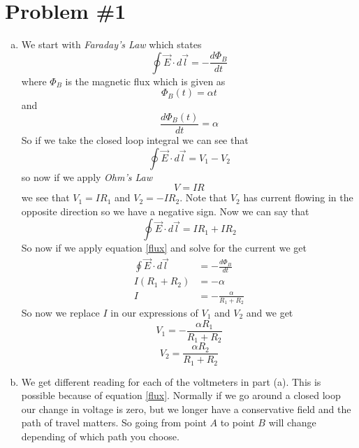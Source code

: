 \documentclass[11pt]{article}
\numberwithin{equation}{section}
\newcommand{\vecE}{\vec{E}}
\begin{document}


\section{Problem \#1}
\begin{enumerate}[(a)]
\item 
We start with \emph{Faraday's Law} which states
\begin{equation}
\oint\vec{E}\cdot d\vec{l} = -\frac{d\Phi_B}{dt}
\label{flux}
\end{equation}
where $\Phi_B$ is the magnetic flux which is given as
$$\Phi_B(t) = \alpha t$$
and 
$$\frac{d\Phi_B(t)}{dt} = \alpha$$
So if we take the closed loop integral we can see that
$$\oint\vecE\cdot d\vec{l} = V_1-V_2$$
so now if we apply \emph{Ohm's Law} 
\begin{equation}
V = IR
\label{ohms}
\end{equation}
we see that $V_1 = IR_1$ and $V_2 = -IR_2$. Note that $V_2$ has current flowing in the opposite direction so we have a negative sign. Now we can say that
$$\oint\vecE\cdot d\vec{l} = IR_1+IR_2$$
So now if we apply equation \ref{flux} and solve for the current we get
\begin{align*}
\oint\vec{E}\cdot d\vec{l} &= -\frac{d\Phi_B}{dt}\\
I(R_1+R_2) &= -\alpha\\
I &= -\frac{\alpha}{R_1+R_2}
\end{align*}
So now we replace $I$ in our expressions of $V_1$ and $V_2$ and we get
$$V_1 = -\frac{\alpha R_1}{R_1+R_2}$$
$$V_2 = \frac{\alpha R_2}{R_1+R_2}$$

\item
We get different reading for each of the voltmeters in part (a). This is possible because of equation \ref{flux}. Normally if we go around a closed loop our change in voltage is zero, but we longer have a conservative field and the path of travel matters. So going from point $A$ to point $B$ will change depending of which path you choose.


\end{enumerate}
\end{document}
